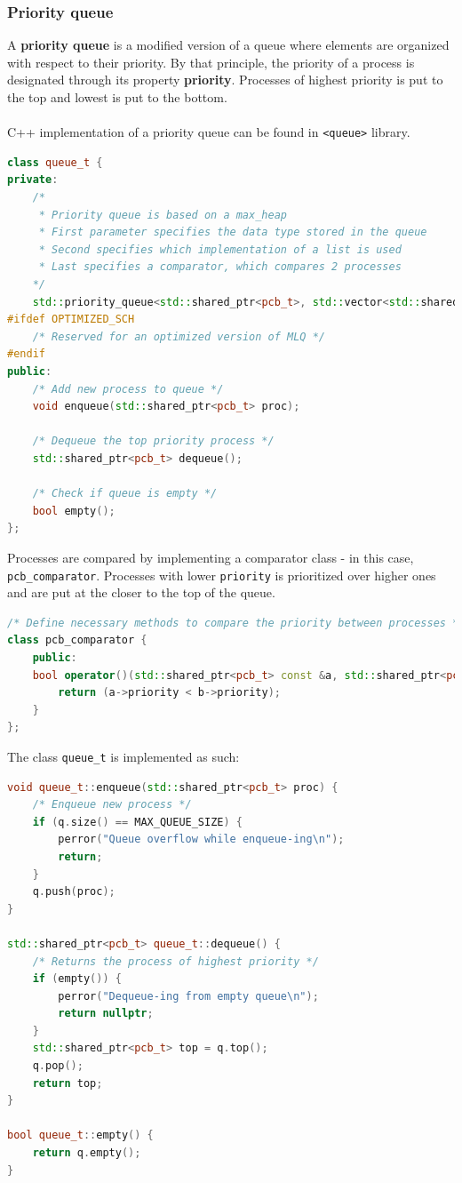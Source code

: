 \documentclass[]{article}
\begin{document}
\subsubsection{Priority queue}
A \textbf{priority queue} is a modified version of a queue where elements are organized with respect to their priority. By that principle, the priority of a process is designated through its property \textbf{priority}. Processes of highest priority is put to the top and lowest is put to the bottom. \\
\\
C++ implementation of a priority queue can be found in \lstinline|<queue>| library.
\begin{lstlisting}[language=C++]
class queue_t {
private:
	/* 
	 * Priority queue is based on a max_heap
	 * First parameter specifies the data type stored in the queue
	 * Second specifies which implementation of a list is used
	 * Last specifies a comparator, which compares 2 processes 
	*/
	std::priority_queue<std::shared_ptr<pcb_t>, std::vector<std::shared_ptr<pcb_t>>, pcb_comparator> q;
#ifdef OPTIMIZED_SCH
	/* Reserved for an optimized version of MLQ */
#endif
public:
	/* Add new process to queue */
	void enqueue(std::shared_ptr<pcb_t> proc);
		
	/* Dequeue the top priority process */
	std::shared_ptr<pcb_t> dequeue();
		
	/* Check if queue is empty */
	bool empty();
};
\end{lstlisting}
Processes are compared by implementing a comparator class - in this case, \lstinline|pcb_comparator|. Processes with lower \lstinline|priority| is prioritized over higher ones and are put at the closer to the top of the queue.
\begin{lstlisting}[language=C++]
/* Define necessary methods to compare the priority between processes */
class pcb_comparator {
	public:
	bool operator()(std::shared_ptr<pcb_t> const &a, std::shared_ptr<pcb_t> const &b) {
		return (a->priority < b->priority);
	}
};
\end{lstlisting}
The class \lstinline|queue_t| is implemented as such:
\begin{lstlisting}[language=C++]
void queue_t::enqueue(std::shared_ptr<pcb_t> proc) {
	/* Enqueue new process */
	if (q.size() == MAX_QUEUE_SIZE) {
		perror("Queue overflow while enqueue-ing\n");
		return;
	}
	q.push(proc);
}

std::shared_ptr<pcb_t> queue_t::dequeue() {
	/* Returns the process of highest priority */
	if (empty()) {
		perror("Dequeue-ing from empty queue\n");
		return nullptr;
	}
	std::shared_ptr<pcb_t> top = q.top();
	q.pop();
	return top;
}

bool queue_t::empty() {
	return q.empty();
}
\end{lstlisting}
\end{document}
